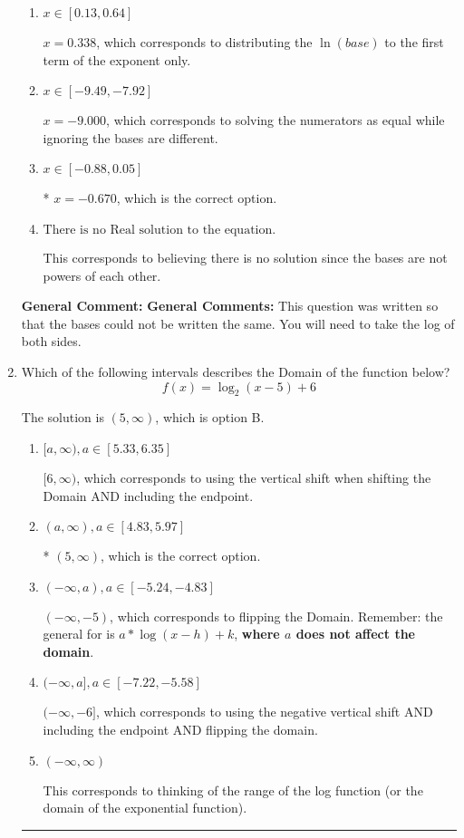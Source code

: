 \documentclass{extbook}[14pt]
\newcommand{\litem}[1]{\item #1

\rule{\textwidth}{0.4pt}}
\begin{document}
\begin{enumerate}
{\begin{enumerate}[label=\Alph*.]
$x = 17.858$, which corresponds to distributing the $\ln(base)$ to the second term of the exponent only.
\item \( x \in [0.13, 0.64] \)

$x = 0.338$, which corresponds to distributing the $\ln(base)$ to the first term of the exponent only.
\item \( x \in [-9.49, -7.92] \)

$x = -9.000$, which corresponds to solving the numerators as equal while ignoring the bases are different.
\item \( x \in [-0.88, 0.05] \)

* $x = -0.670$, which is the correct option.
\item \( \text{There is no Real solution to the equation.} \)

This corresponds to believing there is no solution since the bases are not powers of each other.
\end{enumerate}

\textbf{General Comment:} \textbf{General Comments:} This question was written so that the bases could not be written the same. You will need to take the log of both sides.
}
\litem{
Which of the following intervals describes the Domain of the function below?
\[ f(x) = \log_2{(x-5)}+6 \]

The solution is \( (5, \infty) \), which is option B.\begin{enumerate}[label=\Alph*.]
\item \( [a, \infty), a \in [5.33, 6.35] \)

$[6, \infty)$, which corresponds to using the vertical shift when shifting the Domain AND including the endpoint.
\item \( (a, \infty), a \in [4.83, 5.97] \)

* $(5, \infty)$, which is the correct option.
\item \( (-\infty, a), a \in [-5.24, -4.83] \)

$(-\infty, -5)$, which corresponds to flipping the Domain. Remember: the general for is $a*\log(x-h)+k$, \textbf{where $a$ does not affect the domain}.
\item \( (-\infty, a], a \in [-7.22, -5.58] \)

$(-\infty, -6]$, which corresponds to using the negative vertical shift AND including the endpoint AND flipping the domain.
\item \( (-\infty, \infty) \)

This corresponds to thinking of the range of the log function (or the domain of the exponential function).
\end{enumerate}

}
\end{enumerate}
\end{document}

